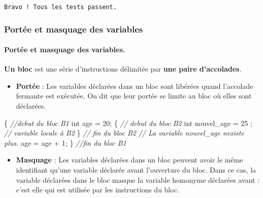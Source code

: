 \documentclass[11pt]{article}
\providecommand{\tightlist}{%
      \setlength{\itemsep}{0pt}\setlength{\parskip}{0pt}}
\newenvironment{Shaded}{}{}
\newcommand{\DataTypeTok}[1]{\textcolor[rgb]{0.56,0.13,0.00}{{#1}}}
\newcommand{\DecValTok}[1]{\textcolor[rgb]{0.25,0.63,0.44}{{#1}}}
\newcommand{\CommentTok}[1]{\textcolor[rgb]{0.38,0.63,0.69}{\textit{{#1}}}}
\newcommand{\NormalTok}[1]{{#1}}
\begin{document}
    \begin{Verbatim}[commandchars=\\\{\}]
Bravo ! Tous les tests passent.
    \end{Verbatim}

    \hypertarget{portuxe9e-et-masquage-des-variables}{%
\subsubsection{Portée et masquage des
variables}\label{portuxe9e-et-masquage-des-variables}}

    \hypertarget{portuxe9e-et-masquage-des-variables.}{%
\paragraph{Portée et masquage des
variables.}\label{portuxe9e-et-masquage-des-variables.}}

\textbf{Un bloc} est une série d'instructions délimitée par \textbf{une
paire d'accolades}.

\begin{itemize}
\tightlist
\item
  \textbf{Portée} : Les variables déclarées dans un bloc sont libérées
  quand l'accolade fermante est exécutée. On dit que leur portée se
  limite au bloc où elles sont déclarées.
\end{itemize}

\begin{Shaded}
\begin{Highlighting}[]
\NormalTok{\{ }\CommentTok{//debut du bloc B1}
    \DataTypeTok{int}\NormalTok{ age = }\DecValTok{20}\NormalTok{;}
\NormalTok{    \{ }\CommentTok{// debut du bloc B2}
        \DataTypeTok{int}\NormalTok{ nouvel\_age = }\DecValTok{25}\NormalTok{ ; }\CommentTok{// variable locale à B2}
\NormalTok{    \} }\CommentTok{// fin du bloc B2}
    \CommentTok{// La variable nouvel\_age n\textquotesingle{}existe plus. }
\NormalTok{    age = age + }\DecValTok{1}\NormalTok{;}
\NormalTok{\} }\CommentTok{//fin du bloc B1}
\end{Highlighting}
\end{Shaded}

\begin{itemize}
\tightlist
\item
  \textbf{Masquage} : Les variables déclarées dans un bloc peuvent avoir
  le même identifiant qu'une variable déclarée avant l'ouverture du
  bloc. Dans ce cas, la variable déclarées dans le bloc masque la
  variable homonyme déclarées avant : c'est elle qui est utilisée par
  les instructions du bloc.
\end{itemize}
\end{document}
